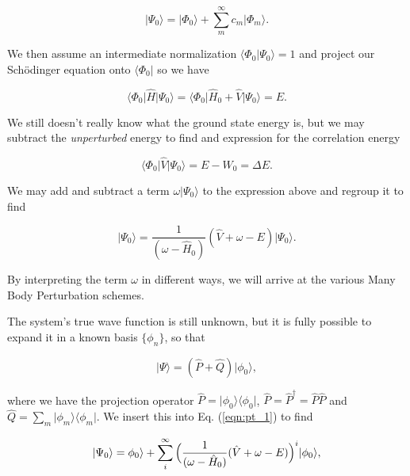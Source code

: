 \begin{equation}
\vert \Psi_0 \rangle = \vert \Phi_0 \rangle + \sum_m^\infty c_m \vert \Phi_m \rangle.
\end{equation}
 
We then assume an intermediate normalization $\langle \Phi_0 \vert \Psi_0 \rangle = 1$ and project our Schödinger equation onto $\langle \Phi_0 \vert$ so we have

\begin{equation}
\langle \Phi_0 \vert \hat{H} \vert \Psi_0 \rangle = \langle \Phi_0 \vert \hat{H}_0 + \hat{V} \vert \Psi_0 \rangle = E.
\end{equation}

We still doesn't really know what the ground state energy is, but we may subtract the \emph{unperturbed} energy to find and expression for the correlation energy

\begin{equation}
\langle \Phi_0 \vert \hat{V} \vert \Psi_0 \rangle = E - W_0 = \Delta E.
\end{equation}

We may add and subtract a term $\omega \vert \Psi_0 \rangle$ to the expression above and regroup it to find

\begin{equation}
\vert \Psi_0  \rangle = \frac{1}{(\omega - \hat{H}_0)} (\hat{V} + \omega - E) \vert \Psi_0 \rangle .
\label{eqn:pt_1}
\end{equation}

By interpreting the term $\omega$ in different ways, we will arrive at the various Many Body Perturbation schemes.

The system's true wave function is still unknown, but it is fully possible to expand it in a known basis $\{\phi_n \}$, so that

\begin{equation}
\vert \Psi \rangle = (\hat{P} + \hat{Q})\vert \phi_0 \rangle,
\end{equation}

where we have the projection operator $\hat{P} = \vert \phi_0 \rangle \langle \phi_0 \vert$, $\hat{P} = \hat{P}^\dagger = \hat{P}\hat{P}$ and $\hat{Q} = \sum_{m} \vert \phi_m \rangle \langle \phi_m \vert$. \cite{ShavittBartlett2009} We insert this into Eq. (\ref{eqn:pt_1}) to find

\begin{equation}
\vert \Psi_0  \rangle = \phi_0 \rangle + \sum_i^\infty \Big{(} \frac{1}{(\omega - \hat{H}_0)} (\hat{V} + \omega - E) \Big{)}^i \vert \phi_0 \rangle ,
\label{eqn:pt_2}
\end{equation}

